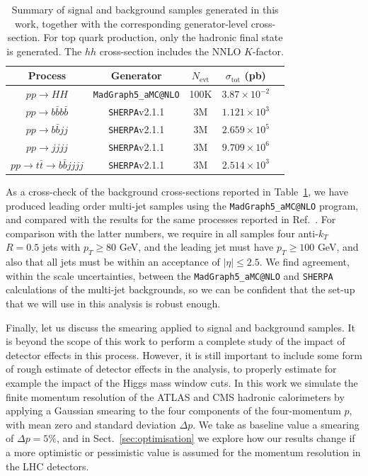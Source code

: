 \begin{table}[h]
\begin{center}
\begin{tabular}{|c|c|c|c|c|}
\hline
Process &  Generator & $N_{\mathrm{evt}}$ & $\sigma_{\mathrm{tot}}$ (pb) \\
\hline
\hline
$pp \to HH$ &  {\tt MadGraph5\_aMC@NLO} & 100K & $3.87\times10^{-2}$  \\
\hline
\hline
$pp \to b\bar{b}b\bar{b}$ &  {\tt SHERPA}v2.1.1 & 3M &$1.121 \times10^3$  \\
$pp \to b\bar{b}jj$ &  {\tt SHERPA}v2.1.1 & 3M & $2.659 \times 10^5$  \\
$pp \to jjjj$ &  {\tt SHERPA}v2.1.1 & 3M  & $9.709\times 10^6$  \\
$pp \to t\bar{t}\to b\bar{b}jjjj$ &  {\tt SHERPA}v2.1.1 & 3M & $2.514\times 10^3$ \\
\hline
\end{tabular}
\caption{\small Summary of signal and background samples generated in this work,
  together with the corresponding generator-level cross-section.
  For top quark production, only the hadronic final state is generated.
The $hh$ cross-section includes the NNLO $K$-factor.  
} \label{tab:samples}
\end{center}
\end{table}%

As a cross-check of the background cross-sections reported in Table~\ref{tab:samples}, we have produced leading order
multi-jet samples
using the {\tt MadGraph5\_aMC@NLO} program, and compared with the results for the same processes reported in
Ref.~\cite{Alwall:2014hca}.
%
For comparison with the latter numbers, 
we require in all samples four anti-$k_T$ $R=0.5$ jets with $p_T \ge 80 $ GeV, and the leading jet must have $p_T \ge 100$ GeV, and
also that all jets must be within an acceptance of $|\eta| \le 2.5 $.
%
We find agreement, within the scale uncertainties, between the {\tt MadGraph5\_aMC@NLO} and {\tt SHERPA} calculations of the multi-jet
backgrounds, so we can be confident that the set-up that we will use in this analysis is robust enough.



Finally, let us discuss the smearing applied to signal
and background samples.
%
It is beyond the scope of this work to perform a complete study of the impact of
detector effects in this process.
%
However, it is still important to include some form of rough estimate of detector
effects in the analysis, to properly estimate for example the impact
of the Higgs mass window cuts.
%
In this work we simulate the finite momentum resolution of the ATLAS and CMS
hadronic calorimeters by applying a Gaussian smearing to the four components
of the four-momentum $p$, with mean zero and standard deviation $\Delta p$.
%
We take as baseline value a smearing of $\Delta p=5\%$, and in
Sect.~\ref{sec:optimisation} we explore how our results change
if a more optimistic or pessimistic value is assumed for the momentum
resolution in the LHC detectors.
